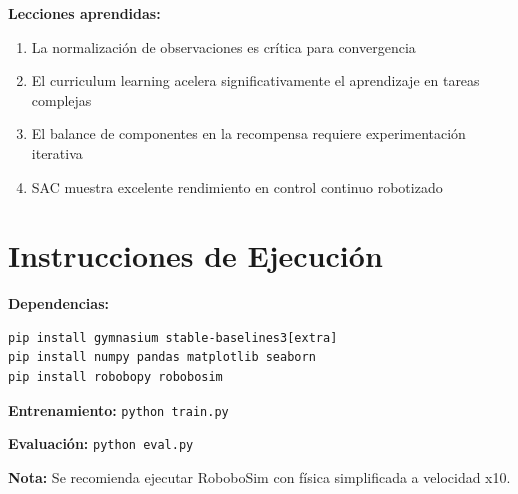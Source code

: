 \documentclass[12pt,a4paper]{article}
\begin{document}
\textbf{Lecciones aprendidas:}
\begin{enumerate}
    \item La normalización de observaciones es crítica para convergencia
    \item El curriculum learning acelera significativamente el aprendizaje en tareas complejas
    \item El balance de componentes en la recompensa requiere experimentación iterativa
    \item SAC muestra excelente rendimiento en control continuo robotizado
\end{enumerate}

\section*{Instrucciones de Ejecución}

\textbf{Dependencias:}
\begin{verbatim}
pip install gymnasium stable-baselines3[extra]
pip install numpy pandas matplotlib seaborn
pip install robobopy robobosim
\end{verbatim}

\textbf{Entrenamiento:} \texttt{python train.py}

\textbf{Evaluación:} \texttt{python eval.py}

\textbf{Nota:} Se recomienda ejecutar RoboboSim con física simplificada a velocidad x10.
\end{document}
